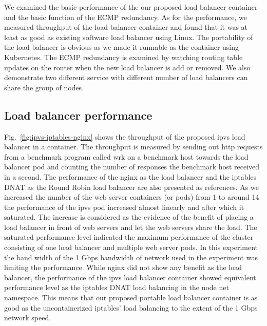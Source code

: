 We examined the basic performance of the our proposed load balancer container and the basic function of the ECMP redundancy.
As for the performance, we measured throughput of the load balancer container and found that it was at least as good as existing software load balancer using Linux. The portability of the load balancer is obvious as we made it runnable as the container using Kubernetes.  
The ECMP redundancy is examined by watching routing table updates on the router when the new load balancer is add or removed. 
We also demonstrate two different service with different number of load balancers can share the group of nodes.

\subsection{Load balancer performance}

Fig.~\ref{fig:ipvs-iptables-nginx} shows the throughput of the proposed ipvs load balancer in a container.
The throughput is measured by sending out http requests from a benchmark program called wrk\cite{Glozer2016} on a benchmark host towards the load balancer pod and counting the number of responses the benchmark host received in a second.
The performance of the nginx as the load balancer and the iptables DNAT as the Round Robin load balancer are also presented as references.
As we increased the number of the web server containers (or pods) from 1 to around 14 the performance of the ipvs pod increased almost linearly and after which it saturated. 
The increase is considered as the evidence of the benefit of placing a load balancer in front of web servers and let the web servers share the load.
The saturated performance level indicated the maximum performance of the cluster consisting of one load balancer and multiple web server pods.
In this experiment the band width of the 1 Gbps bandwidth of network used in the experiment\cite{takahashi2018portable} was limiting the performance.
While nginx did not show any benefit as the load balancer, the performance of the ipvs load balancer container showed equivalent performance level as the iptables DNAT load balancing in the node net namespace. 
This means that our proposed portable load balancer container is as good as the uncontainerized iptables' load balancing to the extent of the 1 Gbps network speed. 

